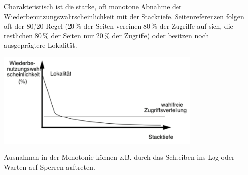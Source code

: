 \begin{enumerate}[a)]
\begin{solution}
Charakteristisch ist die starke, oft monotone Abnahme der Wiederbenutzungswahrscheinlichkeit mit der Stacktiefe. Seitenreferenzen folgen oft der 80/20-Regel (20\,\% der Seiten vereinen 80\,\% der Zugriffe auf sich, die restlichen 80\,\% der Seiten nur 20\,\% der Zugriffe) oder besitzen noch ausgeprägtere Lokalität.

\begin{center}
\includegraphics[width = 10cm]{Pictures/Ue07_Aufgabe2_Zusatz2.png}
\end{center}

Ausnahmen in der Monotonie können z.B. durch das Schreiben ins Log oder Warten auf Sperren auftreten.
\end{solution}

%
%


\end{enumerate}
